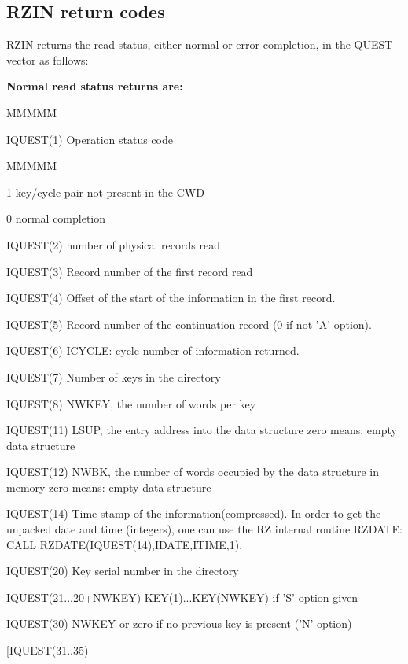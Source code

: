 \subsection{RZIN return codes}
\par RZIN returns the read status, either normal or error completion,
in the QUEST vector as follows:
\par {\bf Normal read status returns are:}
\begin{DL}{MMMMM}
\item[IQUEST(1)
]Operation status code
\begin{DL}{MMMMM}
\item[ 1
]key/cycle pair not present in the CWD
\item[ 0
]normal completion
\end{DL}
\item[IQUEST(2)
]number of physical records read
\item[IQUEST(3)
]Record number of the first record read
\item[IQUEST(4)
]Offset of the start of the information in the first record.
\item[IQUEST(5)
]Record number of the continuation record (0 if not 'A' option).
\item[IQUEST(6)
]ICYCLE: cycle number of information returned.
\item[IQUEST(7)
]Number of keys in the directory
\item[IQUEST(8)
]NWKEY, the number of words per key
\par
\item[IQUEST(11)
]LSUP, the entry address into the data structure
\newline zero means: empty data structure
\item[IQUEST(12)
]NWBK, the number of words occupied by the data structure in memory
\newline zero means: empty data structure
\item[IQUEST(14)
]Time stamp of the information(compressed). In order to get
the unpacked date and time (integers), one can use the RZ internal
routine RZDATE: CALL RZDATE(IQUEST(14),IDATE,ITIME,1).
\item[IQUEST(20)
]Key serial number in the directory
\item[IQUEST(21...20+NWKEY)
]KEY(1)...KEY(NWKEY) if 'S' option given
\par
\item[IQUEST(30)
]NWKEY or zero if no previous key is present ('N' option)
\item[IQUEST(31..35)

\end{DL}
